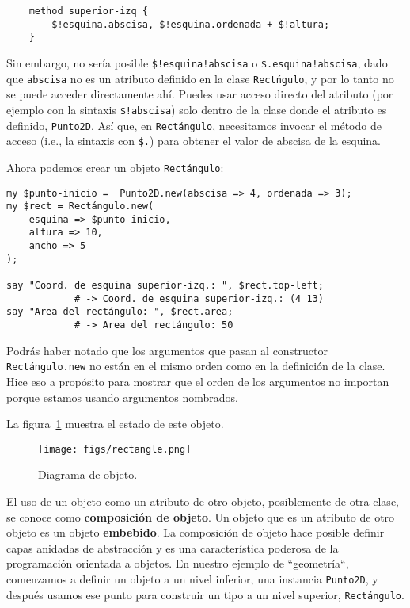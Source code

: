 \begin{verbatim}
    method superior-izq { 
    	$!esquina.abscisa, $!esquina.ordenada + $!altura;
    }
\end{verbatim}

Sin embargo, no sería posible \verb|$!esquina!abscisa| o 
\verb|$.esquina!abscisa|, dado que {\tt abscisa} no es un 
atributo definido en la clase {\tt Rectńgulo}, y por lo tanto
no se puede acceder directamente ahí. Puedes usar acceso directo
del atributo (por ejemplo con la sintaxis \verb|$!abscisa|)
solo dentro de la clase donde el atributo es definido, {\tt Punto2D}.
Así que, en {\tt Rectángulo}, necesitamos invocar el método de
acceso (i.e., la sintaxis con \verb|$.|) para obtener el valor
de abscisa de la esquina. 

Ahora podemos crear un objeto {\tt Rectángulo}:

\begin{verbatim}
my $punto-inicio =  Punto2D.new(abscisa => 4, ordenada => 3);
my $rect = Rectángulo.new(
	esquina => $punto-inicio, 
	altura => 10, 
	ancho => 5
);

say "Coord. de esquina superior-izq.: ", $rect.top-left;   
			# -> Coord. de esquina superior-izq.: (4 13)
say "Area del rectángulo: ", $rect.area;      
			# -> Area del rectángulo: 50
\end{verbatim}


Podrás haber notado que los argumentos que pasan al 
constructor {\tt Rectángulo.new} no están en el mismo 
orden como en la definición de la clase. Hice eso a 
propósito para mostrar que el orden de los argumentos
no importan porque estamos usando argumentos nombrados.

La figura~\ref{fig.rectangle} muestra el estado de este objeto.

\begin{figure}[h]
\centerline
{\texttt{[image: figs/rectangle.png]}}
\caption{Diagrama de objeto.}
\label{fig.rectangle}
\end{figure}


El uso de un objeto como un atributo de otro objeto, posiblemente
de otra clase, se conoce como {\bf composición de objeto}. 
Un objeto que es un atributo de otro objeto es un objeto 
{\bf embebido}. La composición de objeto hace posible 
definir capas anidadas de abstracción y es una característica
poderosa de la programación orientada a objetos. En nuestro 
ejemplo de ``geometría``, comenzamos a definir un objeto 
a un nivel inferior, una instancia {\tt Punto2D}, y después usamos
ese punto para construir un tipo a un nivel superior, {\tt Rectángulo}.


